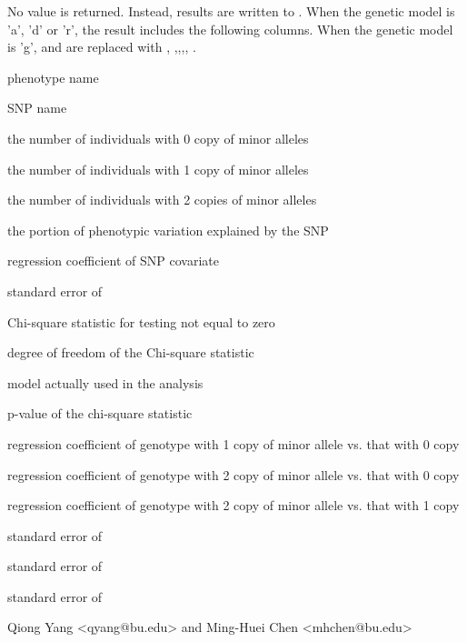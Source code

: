 \begin{Value}
No value is returned. Instead, results are written to .
When the genetic model is 'a', 'd' or 'r', the result includes the following columns.
When the genetic model is 'g',  and  are replaced with ,
,,,, .

\begin{ldescription}
\item[\code{phen }] phenotype name
\item[\code{snp }] SNP name
\item[\code{n0 }] the number of individuals with 0 copy of minor alleles
\item[\code{n1 }] the number of individuals with 1 copy of minor alleles
\item[\code{n2 }] the number of individuals with 2 copies of minor alleles
\item[\code{h2q }] the portion of phenotypic variation explained by the SNP
\item[\code{beta }] regression coefficient of SNP covariate
\item[\code{se }] standard error of 
\item[\code{chisq }] Chi-square statistic for testing  not equal to zero
\item[\code{df }] degree of freedom of the Chi-square statistic
\item[\code{model }] model actually used in the analysis
\item[\code{pval }] p-value of the chi-square statistic
\item[\code{  }] 
\item[\code{beta10 }] regression coefficient of genotype with 1 copy of minor allele vs. that with 0 copy
\item[\code{beta20 }] regression coefficient of genotype with 2 copy of minor allele vs. that with 0 copy
\item[\code{beta21 }] regression coefficient of genotype with 2 copy of minor allele vs. that with 1 copy
\item[\code{se10 }] standard error of 
\item[\code{se20 }] standard error of 
\item[\code{se21 }] standard error of 
\end{ldescription}
\end{Value}
\begin{Author}\relax
Qiong Yang <qyang@bu.edu> and Ming-Huei Chen <mhchen@bu.edu>
\end{Author}
